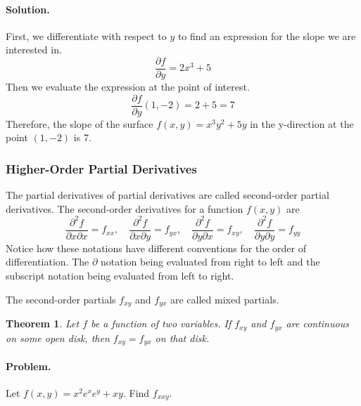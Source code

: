\documentclass[12pt, oneside]{book}
\newtheorem{theorem}{Theorem}
\begin{document}
\paragraph{Solution.}
First, we differentiate with respect to \(y\) to find an expression for the slope we are interested in.
\[\frac{\partial f}{\partial y} = 2x^{3} + 5\]
Then we evaluate the expression at the point of interest.
\[\frac{\partial f}{\partial y}\left(1, -2\right) = 2 + 5 = 7\]
Therefore, the slope of the surface \(f(x, y) = x^{3}y^{2} + 5y\) in the y-direction at the point \((1, -2)\) is 7.

\subsubsection{Higher-Order Partial Derivatives}
The partial derivatives of partial derivatives are called second-order partial
derivatives. The second-order derivatives for a function \(f\left(x, y\right)\)
are
\[\frac{\partial^2 f}{\partial x \partial x} = f_{xx},
\quad \frac{\partial^2 f}{\partial x \partial y} = f_{yx},
\quad \frac{\partial^2 f}{\partial y \partial x} = f_{xy},
\quad \frac{\partial^2 f}{\partial y \partial y} = f_{yy}\]
Notice how these notations have different conventions for the order of
differentiation. The \(\partial\) notation being evaluated from right to left
and the subscript notation being evaluated from left to right.

The second-order partials \(f_{xy}\) and \(f_{yx}\) are called mixed partials.

\begin{theorem}
    Let \(f\) be a function of two variables. If \(f_{xy}\) and \(f_{yx}\) are
    continuous on some open disk, then \(f_{xy} = f_{yx}\) on that disk.
\end{theorem}

\paragraph{Problem.} Let \(f\left(x, y\right) = x^2 e^x e^y + xy\). Find \(f_{xxy}\).
\end{document}
